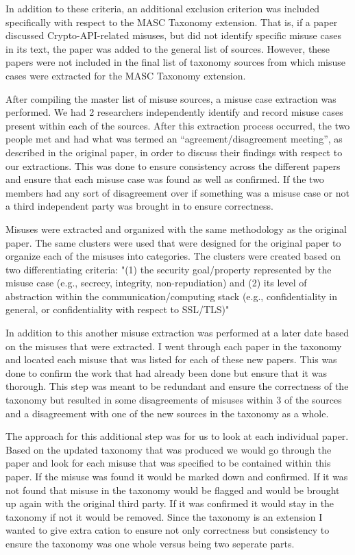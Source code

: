 In addition to these criteria, an additional exclusion criterion was included specifically with respect to the MASC Taxonomy extension.  That is, if a paper discussed Crypto-API-related misuses, but did not identify specific misuse cases in its text, the paper was added to the general list of sources.  However, these papers were not included in the final list of taxonomy sources from which misuse cases were extracted for the MASC Taxonomy extension.

After compiling the master list of misuse sources, a misuse case extraction was performed. We had 2 researchers independently identify and record misuse cases present within each of the sources. After this extraction process occurred, the two people  met and had what was termed an “agreement/disagreement meeting”, as described in the original paper, in order to discuss their findings with respect to our extractions.  This was done to ensure consistency across the different papers and ensure that each misuse case was found as well as confirmed. If the two members had any sort of disagreement over if something was a misuse case or not a third independent party was brought in to ensure correctness. 

Misuses were extracted and organized with the same methodology as the original paper. The same clusters were used that were designed for the original paper to organize each of the misuses into categories. The clusters were created based on two differentiating criteria: "(1) the security goal/property represented by the misuse case  (e.g., secrecy, integrity, non-repudiation) and (2) its level of abstraction within the communication/computing stack (e.g., confidentiality in general, or confidentiality with respect to SSL/TLS)"
    
In addition to this another misuse extraction was performed at a later date based on the misuses that were extracted. I went through each paper in the taxonomy and located each misuse that was listed for each of these new papers. This was done to confirm the work that had already been done but ensure that it was thorough. This step was meant to be redundant and ensure the correctness of the taxonomy but resulted in some disagreements of misuses within 3 of the sources and a disagreement with one of the new sources in the taxonomy as a whole. 

The approach for this additional step was for us to look at each individual paper. Based on the updated taxonomy that was produced we would go through the paper and look for each misuse that was specified to be contained within this paper. If the misuse was found it would be marked down and confirmed. If it was not found that misuse in the taxonomy would be flagged and would be brought up again with the original third party. If it was confirmed it would stay in the taxonomy if not it would be removed. Since the taxonomy is an extension I wanted to give extra cation to ensure not only correctness but consistency to ensure the taxonomy was one whole versus being two seperate parts.
  
